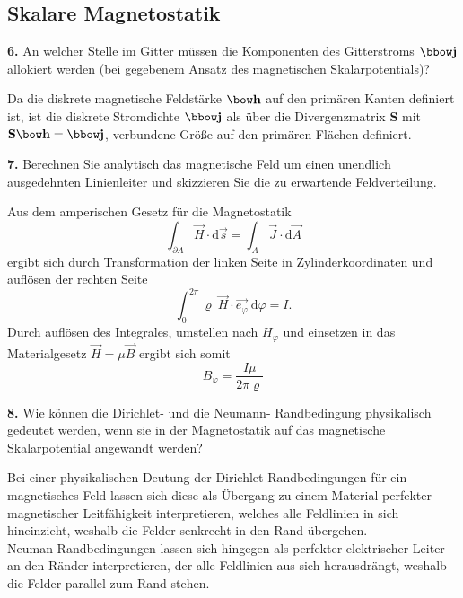 \documentclass[Protokollheft.tex]{subfiles}
\begin{document}
\newpage
%
{\subsection{Skalare Magnetostatik}}

\begin{framed}
	\noindent \textbf{6.} An welcher Stelle im Gitter müssen die Komponenten des Gitterstroms
$\jfit$ allokiert werden (bei gegebenem Ansatz des magnetischen Skalarpotentials)?\label{exer:allocateCurrent}
\end{framed}
\noindent
Da die diskrete magnetische Feldstärke $\hfit$ auf den primären Kanten definiert ist, ist die diskrete Stromdichte $\jfit$ als über die Divergenzmatrix $\mathbf{S}$ mit $\mathbf{S}\hfit = \jfit$, verbundene Größe auf den primären Flächen definiert. 


\begin{framed}
	\noindent \textbf{7.} Berechnen Sie analytisch das magnetische Feld um einen unendlich
ausgedehnten Linienleiter und skizzieren Sie die zu erwartende
Feldverteilung.\label{exer:HfieldAroundLineConductor}
\end{framed}
\noindent
Aus dem amperischen Gesetz für die Magnetostatik
\begin{equation}
	\label{eq:ampere}
	\int_{\partial A} \vec{H} \cdot \text{d}\vec{s} = \int_A \vec{J} \cdot \text{d} \vec{A} 
\end{equation}
ergibt sich durch Transformation der linken Seite in Zylinderkoordinaten und auflösen der rechten Seite
\begin{equation*}
	\int_{0}^{2\pi} \varrho\ \vec{H} \cdot \vec{e_\varphi}   \ \text{d} \varphi = I.
\end{equation*}
Durch auflösen des Integrales, umstellen nach $H_\varphi$ und einsetzen in das Materialgesetz $\vec{H} = \mu \vec{B}$  ergibt sich somit
\begin{equation}
	\label{eq:bLeiter}
	B_\varphi = \frac{I\mu}{2 \pi \varrho} %
\end{equation}


\begin{framed}
	\noindent \textbf{8.} Wie können die Dirichlet- und die Neumann- Randbedingung physikalisch gedeutet werden, wenn sie in der Magnetostatik auf das magnetische Skalarpotential angewandt werden?\label{exer:bndCondMagScalarPot}
\end{framed}
\noindent
Bei einer physikalischen Deutung der Dirichlet-Randbedingungen für ein magnetisches Feld lassen sich diese als Übergang zu einem Material perfekter magnetischer Leitfähigkeit interpretieren, welches alle Feldlinien in sich hineinzieht, weshalb die Felder senkrecht in den Rand übergehen. \\
Neuman-Randbedingungen lassen sich hingegen als perfekter elektrischer Leiter an den Ränder interpretieren, der alle Feldlinien aus sich herausdrängt, weshalb die Felder parallel zum Rand stehen.  
\end{document}
